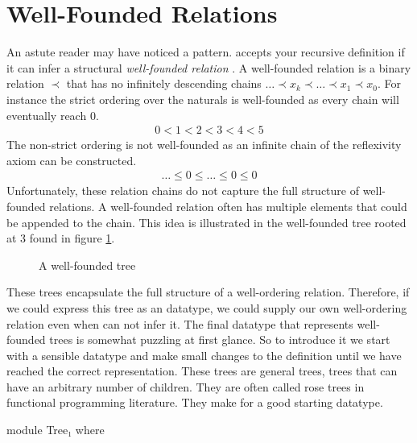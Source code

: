 \documentclass[./Thesis.tex]{subfiles}
\begin{document}
\section{Well-Founded Relations}
\label{sec:well-founded-relations}
An astute reader may have noticed a pattern. \Agda{} accepts your recursive
definition if it can infer a structural \textit{well-founded relation}
\cite{soare}. A well-founded relation is a binary relation $\prec$ that has no
infinitely descending chains $\dots \prec x_k \prec \dots \prec x_1 \prec x_0$.
For instance the strict ordering over the naturals is well-founded
as every chain will eventually reach $0$.
\begin{align}
  \label{eqn:wellfounded-natural}
  0 < 1 < 2 < 3 < 4 < 5
\end{align}
The non-strict ordering is not well-founded as an infinite chain of the
reflexivity axiom can be constructed.
\begin{align}
  \label{eqn:non-wellfounded-natural}
  \dots \leq 0 \leq \dots \leq 0 \leq 0
\end{align}
Unfortunately, these relation chains do not capture the full structure of well-founded
relations. A well-founded relation often has multiple elements that could be
appended to the chain. This idea is illustrated in the well-founded tree
rooted at 3 found in figure \ref{fig:wellfounded-tree}.
\begin{figure}[h]
  \centering
  \caption{A well-founded tree }
  \label{fig:wellfounded-tree}
\end{figure}
These trees encapsulate the full structure of a well-ordering relation.
Therefore, if we could express this tree as an \Agda{} datatype, we could supply
our own well-ordering relation even when \Agda{} can not infer it. The final
datatype that represents well-founded trees is somewhat puzzling at first
glance. So to introduce it we start with a sensible datatype and make small
changes to the definition until we have reached the correct representation.
These trees are general trees, trees that can have an arbitrary number
of children. They are often called rose trees in functional programming
literature. They make for a good starting datatype.
\begin{code}[hide]
  module Tree₁ where
\end{code}
\end{document}
